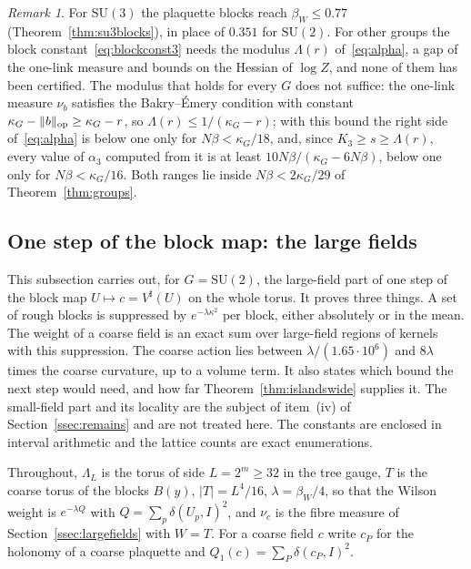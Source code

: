 \documentclass[11pt]{amsart}
\theoremstyle{definition}
\theoremstyle{remark}
\newtheorem{remark}[theorem]{Remark}
\numberwithin{equation}{section}
\newcommand{\SU}{\mathrm{SU}}
\begin{document}
\begin{remark}\label{rem:groups13blocks}
For $\SU(3)$ the plaquette blocks reach $\beta_W\le0.77$
(Theorem~\ref{thm:su3blocks}), in place of $0.351$ for $\SU(2)$. For
other groups the block constant~\eqref{eq:blockconst3} needs the
modulus $\Lambda(r)$ of~\eqref{eq:alpha}, a gap of the one-link measure
and bounds on the Hessian of $\log Z$, and none of them has been
certified. The modulus that holds for every $G$ does not suffice: the
one-link measure $\nu_b$ satisfies the Bakry--\'Emery condition with
constant $\kappa_G-\lVert b\rVert_{\rm op}\ge\kappa_G-r$, so
$\Lambda(r)\le1/(\kappa_G-r)$; with this bound the right side
of~\eqref{eq:alpha} is below one only for $N\beta<\kappa_G/18$, and,
since $K_3\ge s\ge\Lambda(r)$, every value of $\alpha_3$ computed from it
is at least $10N\beta/(\kappa_G-6N\beta)$, below one only for $N\beta<
\kappa_G/16$. Both ranges lie inside $N\beta<2\kappa_G/29$ of
Theorem~\ref{thm:groups}.
\end{remark}

\subsection{One step of the block map: the large fields}\label{ssec:lfstep}

This subsection carries out, for $G=\SU(2)$, the large-field part of one
step of the block map $U\mapsto c=V^\sharp(U)$ on the whole torus. It proves
three things. A set of rough blocks is suppressed by $e^{-\lambda\kappa^2}$
per block, either absolutely or in the mean. The weight of a coarse field
is an exact sum over large-field regions of kernels with this suppression.
The coarse action lies between $\lambda/(1.65\cdot10^6)$ and
$8\lambda$ times the coarse curvature, up to a volume term. It also states
which bound the next step would need, and how far
Theorem~\ref{thm:islandswide} supplies it. The small-field part and its
locality are the subject of item~(iv) of Section~\ref{ssec:remains} and are
not treated here. The constants are enclosed in interval arithmetic and the
lattice counts are exact enumerations.

Throughout, $\Lambda_L$ is the torus of side $L=2^m\ge32$ in the tree gauge,
$T$ is the coarse torus of the blocks $B(y)$, $|T|=L^4/16$, $\lambda=\beta_W/4$,
so that the Wilson weight is $e^{-\lambda Q}$ with $Q=\sum_p\delta(U_p,I)^2$,
and $\nu_c$ is the fibre measure of Section~\ref{ssec:largefields} with $W=T$.
For a coarse field $c$ write $c_P$ for the holonomy of a coarse plaquette
and $Q_1(c)=\sum_P\delta(c_P,I)^2$.
\end{document}
